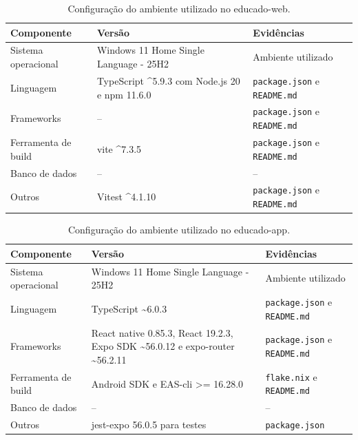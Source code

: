 \begin{table}[H]
\centering
\caption{Configuração do ambiente utilizado no educado-web.}
\label{tab:ambienteWeb}
\begin{tabularx}{\textwidth}{l X X}
\toprule
\textbf{Componente} & \textbf{Versão} & \textbf{Evidências} \\
\midrule
Sistema operacional & Windows 11 Home Single Language - 25H2 & Ambiente utilizado \\
Linguagem & TypeScript \textasciicircum{}5.9.3 com Node.js 20 e npm 11.6.0 & \texttt{package.json} e \texttt{README.md} \cite{educado-repos} \\
Frameworks & -- & \texttt{package.json} e \texttt{README.md} \cite{educado-repos} \\
Ferramenta de build & vite \textasciicircum{}7.3.5 & \texttt{package.json} e \texttt{README.md} \cite{educado-repos} \\
Banco de dados & -- & --\\
Outros & Vitest \textasciicircum{}4.1.10 & \texttt{package.json} e \texttt{README.md} \cite{educado-repos} \\
\bottomrule
\end{tabularx}
\end{table}

\begin{table}[H]
\centering
\caption{Configuração do ambiente utilizado no educado-app.}
\label{tab:ambienteApp}
\begin{tabularx}{\textwidth}{l X X}
\toprule
\textbf{Componente} & \textbf{Versão} & \textbf{Evidências} \\
\midrule
Sistema operacional & Windows 11 Home Single Language - 25H2 & Ambiente utilizado \\
Linguagem & TypeScript \textasciitilde{}6.0.3 & \texttt{package.json} e \texttt{README.md} \cite{educado-repos} \\
Frameworks &  React native 0.85.3, React 19.2.3, Expo SDK \textasciitilde{}56.0.12 e expo-router \textasciitilde{}56.2.11 & \texttt{package.json} e \texttt{README.md} \cite{educado-repos} \\
Ferramenta de build & Android SDK e EAS-cli >= 16.28.0 & \texttt{flake.nix} e \texttt{README.md} \cite{educado-repos} \\
Banco de dados & -- & -- \\
Outros & jest-expo 56.0.5 para testes & \texttt{package.json} \cite{educado-repos} \\
\bottomrule
\end{tabularx}
\end{table}


